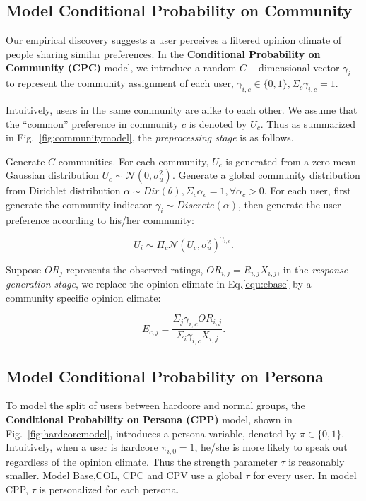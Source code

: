 \documentclass[sigconf]{acmart}
\begin{document}
\subsection{Model Conditional Probability on Community}
Our empirical discovery suggests a user perceives a filtered opinion climate of people sharing similar preferences. In the \textbf{Conditional Probability on Community (CPC)} model, we introduce a random $C-$dimensional vector $\gamma_i$ to represent the community assignment of each user,  $\gamma_{i,c}\in \{0,1\}, \Sigma_c \gamma_{i,c}=1$.  


Intuitively, users in the same community are alike to each other. We assume that the ``common'' preference in community $c$ is denoted by $U_c$. Thus as summarized in Fig.~\ref{fig:communitymodel}, the \textit{preprocessing stage} is as follows.

Generate $C$ communities. For each community, $U_c$ is generated from a zero-mean Gaussian distribution $U_c \sim \mathcal{N}(0,\sigma_u^2)$. Generate a global community distribution from Dirichlet distribution $\alpha\sim Dir(\theta), \Sigma_c \alpha_c=1, \forall \alpha_c>0$. For each user, first generate the community indicator $\gamma_i \sim Discrete(\alpha)$, then generate the user preference according to his/her community:

\begin{equation}\label{equ:preferencebase}
U_i \sim \Pi_c \mathcal{N}(U_c,\sigma_u^2)^{\gamma_{i,c}}.
\end{equation}

Suppose $OR_j$ represents the observed ratings, $OR_{i,j}=R_{i,j}X_{i,j}$, in the \textit{response generation stage}, we replace the opinion climate in Eq.\ref{equ:ebase} by a community specific opinion climate:  

\begin{equation}\label{equ:ecommunity}
 E_{c,j}=\frac{\Sigma_j\gamma_{i,c} OR_{i,j}}{\Sigma_i \gamma_{i,c} X_{i,j}}.
\end{equation}

\subsection{Model Conditional Probability on Persona}
To model the split of users between hardcore and normal groups, the  \textbf{Conditional Probability on Persona (CPP)} model,  shown in Fig.~\ref{fig:hardcoremodel}, introduces a  persona variable,  denoted by $\pi \in \{0,1\}$. Intuitively, when a user is hardcore $\pi_{i,0}=1$, he/she is more likely to speak out regardless of the opinion climate. Thus the strength parameter $\tau$ is reasonably smaller.  Model Base,COL, CPC and CPV use a global $\tau$ for every user. In model CPP, $\tau$ is personalized for each persona.
\end{document}

